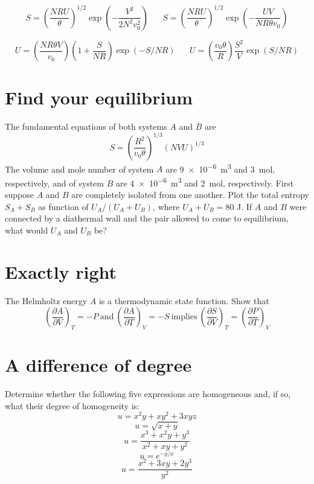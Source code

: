 \documentclass[11pt]{article}
\begin{document}
\[ S = \left ( \frac{NRU}{\theta} \right )^{1/2}\exp
\left (-\frac{V^2}{2N^2v_0^2}
 \right )
\hspace{20pt}
S = \left ( \frac{NRU}{\theta} \right )^{1/2}\exp
\left (-\frac{UV}{NR\theta v_0} \right ) \]

\[ U = \left ( \frac{NR\theta V}{v_0} \right ) \left ( 1+\frac{S}{NR} \right ) \exp
  \left (-S/NR \right )
\hspace{20pt}
U = \left ( \frac{v_0\theta}{R} \right ) \frac{S^2}{V} \exp\left ( S/NR \right )
 \]

\section{Find your equilibrium}
\label{sec:org7341bb0}
The fundamental equations of both systems \(A\) and \(B\) are \[ S = \left (
\frac{R^2}{v_0\theta} \right )^{1/3} \left ( N V U \right )^{1/3} \] The volume
and mole number of system \(A\) are \SI{9e-6}{m^3} and \SI{3}{\mole},
respectively, and of system \(B\) are \SI{4e-6}{m^3} and \SI{2}{\mole},
respectively.  First suppose \(A\) and \(B\) are completely isolated from one
another.  Plot the total entropy \(S_A + S_B\) as function of \(U_A/(U_A + U_B)\),
where \(U_A + U_B = 80\) J. If \(A\) and \(B\) were connected by a diathermal wall and
the pair allowed to come to equilibrium, what would \(U_A\) and \(U_B\) be?

\section{Exactly right}
\label{sec:orgf718f29}
The Helmholtz energy \(A\) is a thermodynamic state function.  Show that
\[ \left (\frac{\partial A}{\partial V}\right )_T = - P \ \text{and}\ \left
  (\frac{\partial A}{\partial T}\right )_V = - S\ \text{implies}\
 \left (\frac{\partial S}{\partial V}\right )_T = \left
  (\frac{\partial P}{\partial T}\right )_V  \]

\section{A difference of degree}
\label{sec:org9c316b0}
Determine whether the following five expressions are homogeneous and, if so, what
  their degree of homogeneity is:
\[ u=x^2y + xy^2 +3xyz \]
\[ u=\sqrt{x+y} \]
\[u=\frac{x^3+x^2y+y^3}{x^2+xy+y^2}\]
\[u=e^{-y/x} \]
\[u=\frac{x^2+3xy+2y^3}{y^2} \]
\end{document}

